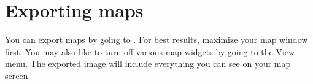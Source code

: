 \section{Exporting maps}
You can export maps by going to . For best results, maximize your map window first. You may also like to turn off various map widgets by going to the View menu. The exported image will include everything you can see on your map screen. 


